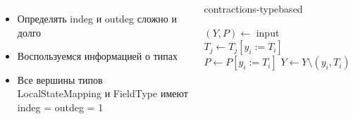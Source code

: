 \documentclass{beamer}
\begin{document}
\begin{frame}
\begin{columns}
    \begin{itemize}
      \item Определять indeg и outdeg сложно и долго
      \item Воспользуемся информацией о типах
      \item Все вершины типов LocalStateMapping и FieldType имеют indeg = outdeg = 1
    \end{itemize}
    \begin{megaalgorithm}\tiny
      \caption{\tiny contractions-typebased}
    \begin{algorithmic}
      \State $(Y, P)\gets$ input
          \If{\textcolor{red}{$typeof(y_i)$ is $LocalStateMapping$ or $FieldType$}}
                  \State $T_j \gets T_j [y_i := T_i]$
              \EndFor
              \State $P \gets P [y_i := T_i]$
              \State $Y\gets Y \setminus (y_i, T_i)$
          \EndIf
      \EndFor
      \State {}
    \end{algorithmic}
  \end{megaalgorithm} 
    \end{columns}
\end{frame}
\end{document}
